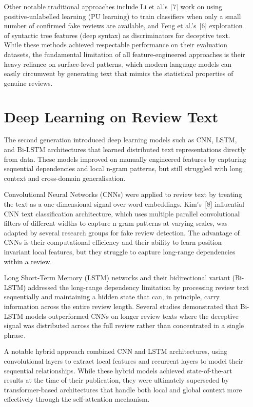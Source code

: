 \documentclass[12pt,a4paper,oneside]{report}
\begin{document}
Other notable traditional approaches include Li et al.'s~[7] work on using
positive-unlabelled learning (PU learning) to train classifiers when only
a small number of confirmed fake reviews are available, and Feng et al.'s~[6]
exploration of syntactic tree features (deep syntax) as discriminators for
deceptive text. While these methods achieved respectable performance on
their evaluation datasets, the fundamental limitation of all
feature-engineered approaches is their heavy reliance on surface-level
patterns, which modern language models can easily circumvent by generating
text that mimics the statistical properties of genuine reviews.

\section{Deep Learning on Review Text}
The second generation introduced deep learning models such as CNN, LSTM,
and Bi-LSTM architectures that learned distributed text representations
directly from data. These models improved on manually engineered features
by capturing sequential dependencies and local n-gram patterns, but still
struggled with long context and cross-domain generalisation.

Convolutional Neural Networks (CNNs) were applied to review text by
treating the text as a one-dimensional signal over word embeddings.
Kim's~[8] influential CNN text classification architecture, which uses
multiple parallel convolutional filters of different widths to capture
n-gram patterns at varying scales, was adapted by several research groups
for fake review detection. The advantage of CNNs is their computational
efficiency and their ability to learn position-invariant local features,
but they struggle to capture long-range dependencies within a review.

Long Short-Term Memory (LSTM) networks and their bidirectional variant
(Bi-LSTM) addressed the long-range dependency limitation by processing
review text sequentially and maintaining a hidden state that can, in
principle, carry information across the entire review length. Several
studies demonstrated that Bi-LSTM models outperformed CNNs on longer
review texts where the deceptive signal was distributed across the full
review rather than concentrated in a single phrase.

A notable hybrid approach combined CNN and LSTM architectures, using
convolutional layers to extract local features and recurrent layers to
model their sequential relationships. While these hybrid models achieved
state-of-the-art results at the time of their publication, they were
ultimately superseded by transformer-based architectures that handle both
local and global context more effectively through the self-attention
mechanism.
\end{document}
